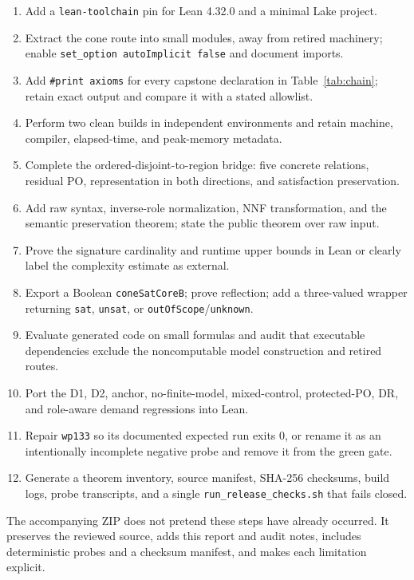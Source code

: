 \documentclass[11pt]{article}
\newcommand{\code}[1]{\texttt{#1}}
\begin{document}
\begin{enumerate}
  \item Add a \code{lean-toolchain} pin for Lean 4.32.0 and a minimal Lake project.
  \item Extract the cone route into small modules, away from retired machinery; enable
  \code{set\_option autoImplicit false} and document imports.
  \item Add \code{\#print axioms} for every capstone declaration in
  Table~\ref{tab:chain}; retain exact output and compare it with a stated allowlist.
  \item Perform two clean builds in independent environments and retain machine,
  compiler, elapsed-time, and peak-memory metadata.
  \item Complete the ordered-disjoint-to-region bridge: five concrete relations,
  residual PO, representation in both directions, and satisfaction preservation.
  \item Add raw syntax, inverse-role normalization, NNF transformation, and the
  semantic preservation theorem; state the public theorem over raw input.
  \item Prove the signature cardinality and runtime upper bounds in Lean or clearly
  label the complexity estimate as external.
  \item Export a Boolean \code{coneSatCoreB}; prove reflection; add a three-valued
  wrapper returning \code{sat}, \code{unsat}, or \code{outOfScope}/\code{unknown}.
  \item Evaluate generated code on small formulas and audit that executable
  dependencies exclude the noncomputable model construction and retired routes.
  \item Port the D1, D2, anchor, no-finite-model, mixed-control, protected-PO, DR, and
  role-aware demand regressions into Lean.
  \item Repair \code{wp133} so its documented expected run exits 0, or rename it as an
  intentionally incomplete negative probe and remove it from the green gate.
  \item Generate a theorem inventory, source manifest, SHA-256 checksums, build logs,
  probe transcripts, and a single \code{run\_release\_checks.sh} that fails closed.
\end{enumerate}

The accompanying ZIP does not pretend these steps have already occurred. It preserves
the reviewed source, adds this report and audit notes, includes deterministic probes and
a checksum manifest, and makes each limitation explicit.
\end{document}

